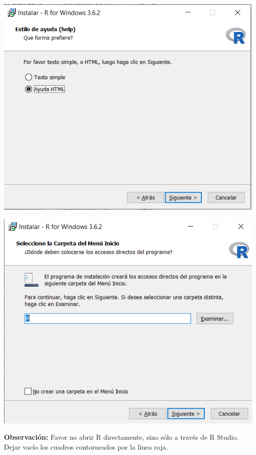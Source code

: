 \documentclass[
]{article}
\begin{document}
\begin{center}\includegraphics[width=8.1in]{./figs/Instalacion R- Win (6)} \end{center}

\begin{center}\includegraphics[width=8.01in]{./figs/Instalacion R- Win (7)} \end{center}

\textbf{Observación:} Favor no abrir R directamente, sino sólo a través
de R Studio. Dejar vacío los cuadros contorneados por la línea roja.
\end{document}
